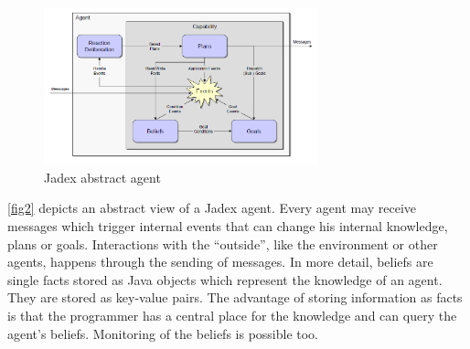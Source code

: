 \begin{figure}
	\centering
	\includegraphics[width=300px]{images/Jadex_agent.png}
	\caption{Jadex abstract agent~\cite{pokahr_jadex_2005}}
	\label{fig2} %
\end{figure}
\autoref{fig2} depicts an abstract view of a Jadex agent.
Every agent may receive messages which trigger internal events that can change his internal knowledge, plans or goals.
Interactions with the \enquote{outside}, like the environment or other agents, happens through the sending of messages. %
In more detail, beliefs are single facts stored as Java objects which represent the knowledge of an agent. %
They are stored as key-value pairs.
The advantage of storing information as facts is that the programmer has a central place for the knowledge and can query the agent's beliefs. %
Monitoring of the beliefs is possible too.

